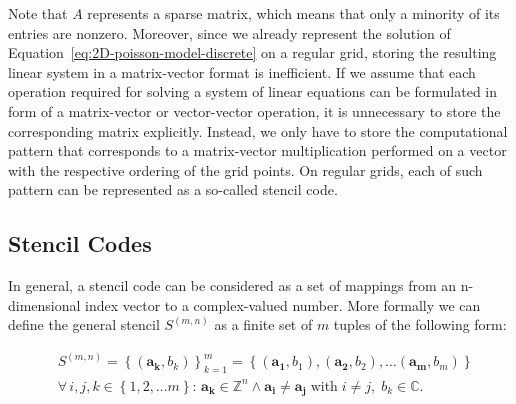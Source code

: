 Note that $A$ represents a sparse matrix, which means that only a minority of its entries are nonzero.
Moreover, since we already represent the solution of Equation~\ref{eq:2D-poisson-model-discrete} on a regular grid, storing the resulting linear system in a matrix-vector format is inefficient.
If we assume that each operation required for solving a system of linear equations can be formulated in form of a matrix-vector or vector-vector operation, it is unnecessary to store the corresponding matrix explicitly.
Instead, we only have to store the computational pattern that corresponds to a matrix-vector multiplication performed on a vector with the respective ordering of the grid points.
On regular grids, each of such pattern can be represented as a so-called stencil code.
\subsection{Stencil Codes}
In general, a stencil code can be considered as a set of mappings from an n-dimensional index vector to a complex-valued number.
More formally we can define the general stencil $S^{(m,n)}$ as a finite set of $m$ tuples of the following form:

\begin{equation}
	\begin{split}
			& S^{(m, n)} = \left\{\left(\bm{a_k}, b_k\right) \right\}_{k=1}^m = \left\{\left(\bm{a_1}, b_1\right),  \left(\bm{a_2}, b_2\right), \dots \left(\bm{a_m}, b_m\right)\right\} 
	\\ & \forall \, i, j, k \in \left\{1, 2, \dots m \right\}: \,
	\bm{a_k} \in \mathbb{Z}^n \wedge \bm{a_i} \neq \bm{a_j} \; \text{with} \; i \neq j, \; b_k \in \mathbb{C}.
	\end{split}
\end{equation}


